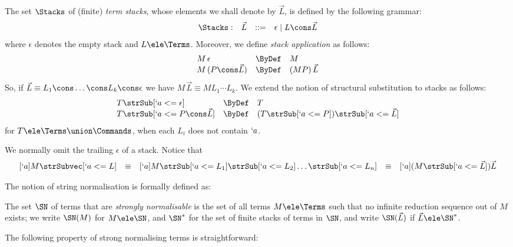 \documentclass{lmcs}
\newcommand{\vect}[1]{\vec{#1}}
\begin{document}
 \begin{defi}
The set $\Stacks$ of (finite) \emph{term stacks}, whose elements we shall denote by $ \vect{L}$, is defined by
the following grammar:
%
 \[ \begin{array}{l@{\quad}rcl}
\Stacks : & \vect{L} & :: =& \epsilon \mid L \cons \vect{L} 
 \end{array} \]
where $\epsilon$ denotes the empty stack and $L \ele\Terms$.
Moreover, we define \emph{stack application} as follows:
%
 \[ \begin{array}{l@{\quad}rl}
M\,\epsilon & \ByDef & M \\
M \, (P\cons \vect{L} ) & \ByDef & (MP) \, \vect{L}
 \end{array} \]
So, if $\vect{L} \equiv L_1\cons \dots \cons L_k\cons\epsilon$ we have $M \, \vect{L} \equiv M L_1 \cdots L_k$. 
We extend the notion of structural substitution to stacks as follows:
%
 \[ \begin{array}{l@{\quad}rl}
T \strSub[ `a <= \epsilon ] & \ByDef & T \\
T \strSub[ `a <= P \cons \vect{L} ] & \ByDef & (T \strSub[ `a <= P ] ) \strSub[ `a <=\vect{L} ] 
 \end{array} \]
for $T \ele \Terms \union \Commands$, when each $L_i$ does not contain $`a$.
 \end{defi}
We normally omit the trailing $\epsilon$ of a stack. 
Notice that
%
 \[ \begin{array}{lclclcl}
[`a]M \strSubvec[ `a <= L ] 
 & \equiv &
[`a]M \strSub[ `a <= L_1 ] \strSub[ `a <= L_2 ] \dots \strSub[ `a <= L_n ] 
 & \equiv &
[`a](M\strSub[ `a <= {\vect{L}} ]) \vect{L} 
 \end{array} \]

The notion of string normalisation is formally defined as:

 \begin{defi} 
The set $\SN$ of terms that are \emph{strongly normalisable} is the set of all terms $M \ele \Terms$ such that no infinite reduction sequence out of $M$ exists; we write $\SN(M)$ for $M \ele \SN$, and $ \SN^*$ for the set of finite stacks of terms in $ \SN$, and write $\SN(\vect{L})$ if $\vect{L} \ele \SN^*$.
 \end{defi}

The following property of strong normalising terms is straightforward:
\end{document}
